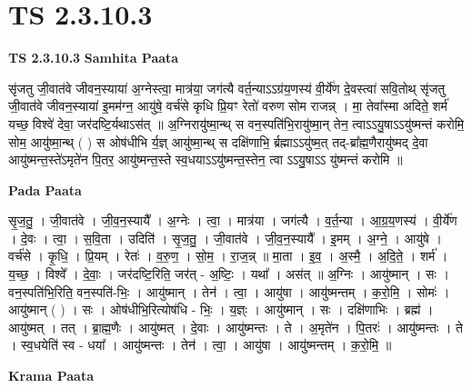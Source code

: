 \documentclass[17pt]{extarticle}
\begin{document}
\section{ TS 2.3.10.3 }

\textbf{TS 2.3.10.3 } \newline
\textbf{Samhita Paata} \newline

सृ॑जतु जी॒वात॑वे जीवन॒स्याया॑ अ॒ग्नेस्त्वा॒ मात्र॑या॒ जग॑त्यै वर्त॒न्याऽऽग्र॑य॒णस्य॑ वी॒र्ये॑ण दे॒वस्त्वा॑ सवि॒तोथ् सृ॑जतु जी॒वात॑वे जीवन॒स्याया॑ इ॒मम॑ग्न॒ आयु॑षे॒ वर्च॑से कृधि प्रि॒यꣳ रेतो॑ वरुण सोम राजन्न् । मा॒ तेवा᳚स्मा अदिते॒ शर्म॑ यच्छ॒ विश्वे॑ देवा॒ जर॑दष्टि॒र्यथाऽस॑त् ॥ अ॒ग्निरायु॑ष्मा॒न्थ् स वन॒स्पति॑भि॒रायु॑ष्मा॒न् तेन॒ त्वाऽऽयु॒षाऽऽयु॑ष्मन्तं करोमि॒ सोम॒ आयु॑ष्मा॒न्थ् ( ) स ओष॑धीभि र्य॒ज्ञ् आयु॑ष्मा॒न्थ् स दक्षि॑णाभि॒ र्ब्रह्माऽऽयु॑ष्म॒त् तद्-ब्रा᳚ह्म॒णैरायु॑ष्मद् दे॒वा आयु॑ष्मन्त॒स्ते॑ऽमृते॑न पि॒तर॒ आयु॑ष्मन्त॒स्ते स्व॒धयाऽऽयु॑ष्मन्त॒स्तेन॒ त्वा ऽऽयु॒षाऽऽ यु॑ष्मन्तं करोमि ॥ \newline

\textbf{Pada Paata} \newline

सृ॒ज॒तु॒ । जी॒वात॑वे । जी॒व॒न॒स्यायै᳚ । अ॒ग्नेः । त्वा॒ । मात्र॑या । जग॑त्यै । व॒र्त॒न्या । आ॒ग्र॒य॒णस्य॑ । वी॒र्ये॑ण । दे॒वः । त्वा॒ । स॒वि॒ता । उदिति॑ । सृ॒ज॒तु॒ । जी॒वात॑वे । जी॒व॒न॒स्यायै᳚ । इ॒मम् । अ॒ग्ने॒ । आयु॑षे । वर्च॑से । कृ॒धि॒ । प्रि॒यम् । रेतः॑ । व॒रु॒ण॒ । सो॒म॒ । रा॒ज॒न्न् ॥ मा॒ता । इ॒व॒ । अ॒स्मै॒ । अ॒दि॒ते॒ । शर्म॑ । य॒च्छ॒ । विश्वे᳚ । दे॒वाः॒ । जर॑दष्टि॒रिति॒ जर॑त् - अ॒ष्टिः॒ । यथा᳚ । अस॑त् ॥ अ॒ग्निः । आयु॑ष्मान् । सः । वन॒स्पति॑भि॒रिति॒ वन॒स्पति॑-भिः॒ । आयु॑ष्मान् । तेन॑ । त्वा॒ । आयु॑षा । आयु॑ष्मन्तम् । क॒रो॒मि॒ । सोमः॑ । आयु॑ष्मान् ( ) । सः । ओष॑धीभि॒रित्योष॑धि - भिः॒ । य॒ज्ञ्ः । आयु॑ष्मान् । सः । दक्षि॑णाभिः । ब्रह्म॑ । आयु॑ष्मत् । तत् । ब्रा॒ह्म॒णैः । आयु॑ष्मत् । दे॒वाः । आयु॑ष्मन्तः । ते । अ॒मृते॑न । पि॒तरः॑ । आयु॑ष्मन्तः । ते । स्व॒धयेति॑ स्व - धया᳚ । आयु॑ष्मन्तः । तेन॑ । त्वा॒ । आयु॑षा । आयु॑ष्मन्तम् । क॒रो॒मि॒ ॥  \newline


\textbf{Krama Paata} \newline
\end{document}
